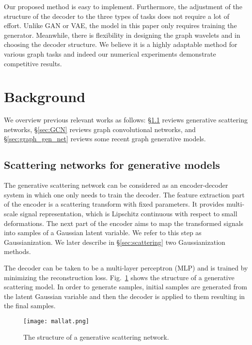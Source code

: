 \documentclass[conference]{IEEEtran}
\begin{document}
Our proposed method is easy to implement. Furthermore, the adjustment of the structure of the decoder to the three types of tasks does not require a lot of effort. 
Unlike GAN or VAE, the model in this paper only requires  training the generator. Meanwhile, there is flexibility in designing the graph wavelets and in choosing the decoder structure. We believe it is a highly adaptable method for various graph tasks and indeed our numerical experiments demonstrate competitive results.

\section{Background}\label{sec:background}

We overview previous relevant works as follows: \S\ref{sec:mallat} reviews generative scattering networks, 
\S\ref{sec:GCN} reviews graph convolutional networks, and \S\ref{sec:graph_gen_net} reviews some recent graph generative models.


\subsection{Scattering networks for generative models} \label{sec:mallat}

The generative scattering network \cite{angles2018generative} can be considered as an encoder-decoder system in  which one only needs to train the decoder. The feature extraction part of the encoder is a scattering transform \cite{mallat2012group, bruna2013invariant} with fixed parameters. It provides multi-scale signal representation, which is Lipschitz continuous with respect to small deformations. The next part of the encoder aims to map the transformed signals into samples of a Gaussian latent variable. We refer to this step as Gaussianization. We later describe in \S\ref{sec:scattering} two Gaussianization methods. 

The decoder  can be taken to be a multi-layer perceptron (MLP) and is trained by minimizing the reconstruction loss.
Fig.~\ref{fig:mallat} shows the structure of a generative scattering model. In order to generate samples, initial samples are generated from the latent Gaussian variable and then the decoder is applied to them resulting in the final samples. 
\begin{figure}[t]
    \centering
    \texttt{[image: mallat.png]}
    \caption{The structure of a generative scattering network.}
    \label{fig:mallat}
\end{figure}
\end{document}
